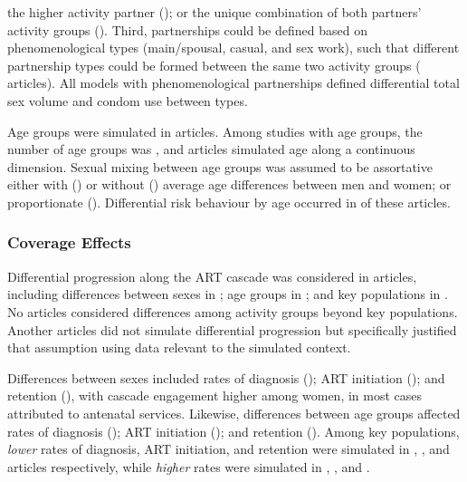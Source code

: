 the higher activity partner (); or
the unique combination of both partners' activity groups ().
Third, partnerships could be defined based on phenomenological types 
(main/spousal, casual, and sex work), such that
different partnership types could be formed between the same two activity groups ( articles).
All models with phenomenological partnerships defined differential total sex volume and condom use between types.
\par
Age groups were simulated in  articles.
Among studies with age groups, the number of age groups was ,
and  articles simulated age along a continuous dimension.
Sexual mixing between age groups was assumed to be assortative
either with () or without ()
average age differences between men and women;
or proportionate ().
Differential risk behaviour by age occurred in  of these  articles.
\subsubsection{Coverage Effects}
\label{sss:res:cov}
Differential progression along the ART cascade was considered in
 articles, including differences between
sexes in ;
age groups in ; and
key populations in .
No articles considered differences among activity groups beyond key populations. %
Another  articles did not simulate differential progression
but specifically justified that assumption using data relevant to the simulated context.
\par
Differences between sexes included
rates of diagnosis ();
ART initiation (); and
retention (),
with cascade engagement higher among women,
in most cases attributed to antenatal services.
Likewise, differences between age groups affected
rates of diagnosis ();
ART initiation (); and
retention ().
Among key populations, \emph{lower} rates of
diagnosis, ART initiation, and retention were simulated in
, , and 
articles respectively, while \emph{higher} rates were simulated in
, , and .
